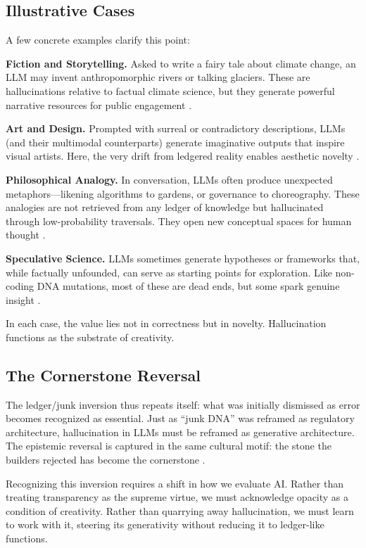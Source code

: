 \documentclass[12pt]{article}
\begin{document}
\subsection{Illustrative Cases}
A few concrete examples clarify this point:

\textbf{Fiction and Storytelling.} Asked to write a fairy tale about climate change, an LLM may invent anthropomorphic rivers or talking glaciers. These are hallucinations relative to factual climate science, but they generate powerful narrative resources for public engagement \citep{bender2021}.

\textbf{Art and Design.} Prompted with surreal or contradictory descriptions, LLMs (and their multimodal counterparts) generate imaginative outputs that inspire visual artists. Here, the very drift from ledgered reality enables aesthetic novelty \citep{manovich2020}.

\textbf{Philosophical Analogy.} In conversation, LLMs often produce unexpected metaphors---likening algorithms to gardens, or governance to choreography. These analogies are not retrieved from any ledger of knowledge but hallucinated through low-probability traversals. They open new conceptual spaces for human thought \citep{hofstadter1995}.

\textbf{Speculative Science.} LLMs sometimes generate hypotheses or frameworks that, while factually unfounded, can serve as starting points for exploration. Like non-coding DNA mutations, most of these are dead ends, but some spark genuine insight \citep{rheinberger1997}.

In each case, the value lies not in correctness but in novelty. Hallucination functions as the substrate of creativity.

\subsection{The Cornerstone Reversal}
The ledger/junk inversion thus repeats itself: what was initially dismissed as error becomes recognized as essential. Just as ``junk DNA'' was reframed as regulatory architecture, hallucination in LLMs must be reframed as generative architecture. The epistemic reversal is captured in the same cultural motif: the stone the builders rejected has become the cornerstone \citep{glissant1997}.

Recognizing this inversion requires a shift in how we evaluate AI. Rather than treating transparency as the supreme virtue, we must acknowledge opacity as a condition of creativity. Rather than quarrying away hallucination, we must learn to work with it, steering its generativity without reducing it to ledger-like functions.
\end{document}
